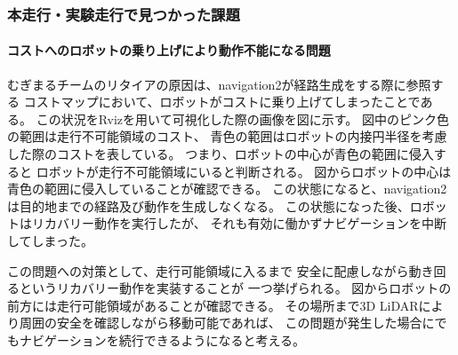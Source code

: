 \subsubsection{本走行・実験走行で見つかった課題}
\paragraph{コストへのロボットの乗り上げにより動作不能になる問題}
むぎまるチームのリタイアの原因は、navigation2が経路生成をする際に参照する
コストマップにおいて、ロボットがコストに乗り上げてしまったことである。
この状況をRvizを用いて可視化した際の画像を図\label{fig:mugimaru_result}に示す。
図中のピンク色の範囲は走行不可能領域のコスト、
青色の範囲はロボットの内接円半径を考慮した際のコストを表している。
つまり、ロボットの中心が青色の範囲に侵入すると
ロボットが走行不可能領域にいると判断される。
図\label{fig:mugimaru_result}からロボットの中心は
青色の範囲に侵入していることが確認できる。
この状態になると、navigation2は目的地までの経路及び動作を生成しなくなる。
この状態になった後、ロボットはリカバリー動作を実行したが、
それも有効に働かずナビゲーションを中断してしまった。

この問題への対策として、走行可能領域に入るまで
安全に配慮しながら動き回るというリカバリー動作を実装することが
一つ挙げられる。
図からロボットの前方には走行可能領域があることが確認できる。
その場所まで3D LiDARにより周囲の安全を確認しながら移動可能であれば、
この問題が発生した場合にでもナビゲーションを続行できるようになると考える。


% 

